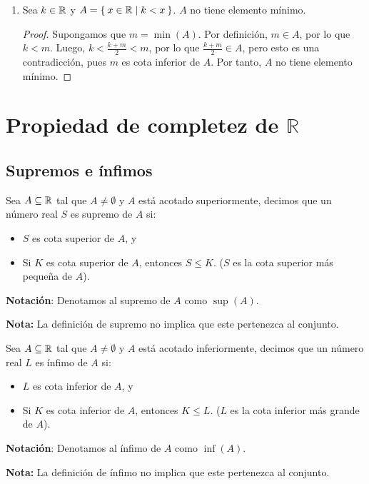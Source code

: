 \begin{enumerate}[label=\alph*)]
  \item Sea $k\in \mathbb{R}$ y $A=\Set{x\in \mathbb{R}|k<x}$. $A$ no tiene elemento mínimo.
  
  \begin{proof}
    Supongamos que $m=\min(A)$. Por definición, $m\in A$, por lo que $k<m$. Luego, $k<\frac{k+m}{2}<m$, por lo que $\frac{k+m}{2}\in A$, pero esto es una contradicción, pues $m$ es cota inferior de $A$. Por tanto, $A$ no tiene elemento mínimo.
  \end{proof}
  
\end{enumerate}

\section*{Propiedad de completez de \(\mathbb{R}\)}

\subsection*{Supremos e ínfimos}

 Sea $A\subseteq \mathbb{R}$ tal que $A\neq \emptyset$ y $A$ está acotado superiormente, decimos que un número real $S$ es supremo de $A$ si:
\begin{itemize}
 \item $S$ es cota superior de $A$, y
 \item Si $K$ es cota superior de $A$, entonces $S\leq K$. ($S$ es la cota superior más pequeña de $A$).
\end{itemize}

\textbf{Notación}: Denotamos al supremo de $A$ como $\sup(A)$.

\textbf{Nota:} La definición de supremo no implica que este pertenezca al conjunto.

 Sea $A\subseteq \mathbb{R}$ tal que $A\neq \emptyset$ y $A$ está acotado inferiormente, decimos que un número real $L$ es ínfimo de $A$ si: \begin{itemize}
 \item $L$ es cota inferior de $A$, y
 \item Si $K$ es cota inferior de $A$, entonces $K\leq L$. ($L$ es la cota inferior más grande de $A$).
\end{itemize}

\textbf{Notación}: Denotamos al ínfimo de $A$ como $\inf(A)$.

\textbf{Nota:} La definición de ínfimo no implica que este pertenezca al conjunto.

